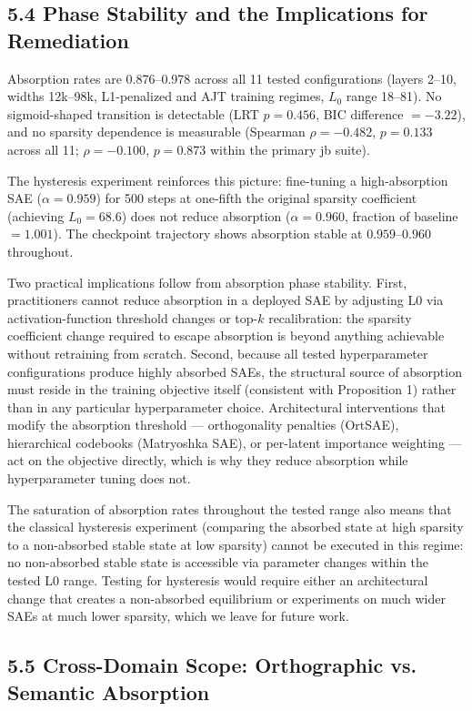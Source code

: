 \documentclass{article}
\begin{document}
\subsection{5.4 Phase Stability and the Implications for Remediation}

Absorption rates are 0.876–0.978 across all 11 tested configurations (layers 2–10, widths
12k–98k, L1-penalized and AJT training regimes, $L_0$ range 18–81). No sigmoid-shaped
transition is detectable (LRT $p = 0.456$, BIC difference $= -3.22$), and no sparsity
dependence is measurable (Spearman $\rho = -0.482$, $p = 0.133$ across all 11; $\rho = -0.100$,
$p = 0.873$ within the primary jb suite).

The hysteresis experiment reinforces this picture: fine-tuning a high-absorption SAE
($\alpha = 0.959$) for 500 steps at one-fifth the original sparsity coefficient
(achieving $L_0 = 68.6$) does not reduce absorption ($\alpha = 0.960$, fraction of baseline
$= 1.001$). The checkpoint trajectory shows absorption stable at $0.959$–$0.960$ throughout.

Two practical implications follow from absorption phase stability. First, practitioners cannot
reduce absorption in a deployed SAE by adjusting L0 via activation-function threshold changes
or top-$k$ recalibration: the sparsity coefficient change required to escape absorption is
beyond anything achievable without retraining from scratch. Second, because all tested
hyperparameter configurations produce highly absorbed SAEs, the structural source of absorption
must reside in the training objective itself (consistent with Proposition 1) rather than in
any particular hyperparameter choice. Architectural interventions that modify the absorption
threshold — orthogonality penalties (OrtSAE), hierarchical codebooks (Matryoshka SAE), or
per-latent importance weighting — act on the objective directly, which is why they reduce
absorption while hyperparameter tuning does not.

The saturation of absorption rates throughout the tested range also means that the classical
hysteresis experiment (comparing the absorbed state at high sparsity to a non-absorbed stable
state at low sparsity) cannot be executed in this regime: no non-absorbed stable state is
accessible via parameter changes within the tested L0 range. Testing for hysteresis would
require either an architectural change that creates a non-absorbed equilibrium or experiments
on much wider SAEs at much lower sparsity, which we leave for future work.

\subsection{5.5 Cross-Domain Scope: Orthographic vs. Semantic Absorption}
\end{document}
